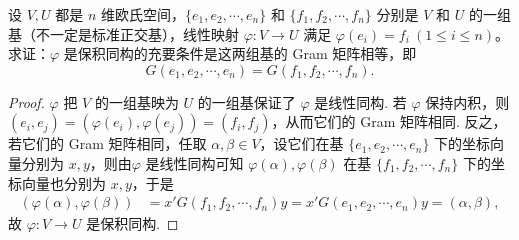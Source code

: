 \documentclass[../../main.tex]{subfiles}%
\begin{document}
\begin{proposition}\label{proposition:例9.35}
设 \(V,U\) 都是 \(n\) 维欧氏空间，\(\{e_1,e_2,\cdots,e_n\}\) 和 \(\{f_1,f_2,\cdots,f_n\}\) 分别是 \(V\) 和 \(U\) 的一组基（不一定是标准正交基），线性映射 \(\varphi:V\rightarrow U\) 满足 \(\varphi(e_i)=f_i\ (1\leqslant  i\leqslant  n)\)。求证：\(\varphi\) 是保积同构的充要条件是这两组基的 Gram 矩阵相等，即
\[
G(e_1,e_2,\cdots,e_n)=G(f_1,f_2,\cdots,f_n).
\]
\end{proposition}
\begin{proof}

\(\varphi\) 把 \(V\) 的一组基映为 \(U\) 的一组基保证了 \(\varphi\) 是线性同构. 若 \(\varphi\) 保持内积，则 \((e_i,e_j)=(\varphi(e_i),\varphi(e_j))=(f_i,f_j)\)，从而它们的 Gram 矩阵相同. 反之，若它们的 Gram 矩阵相同，任取 \(\alpha,\beta\in V\)，设它们在基 \(\{e_1,e_2,\cdots,e_n\}\) 下的坐标向量分别为 \(x,y\)，则由\(\varphi\) 是线性同构可知 \(\varphi(\alpha),\varphi(\beta)\) 在基 \(\{f_1,f_2,\cdots,f_n\}\) 下的坐标向量也分别为 \(x,y\)，于是
\begin{align*}
(\varphi(\alpha),\varphi(\beta))&=x'G(f_1,f_2,\cdots,f_n)y=x'G(e_1,e_2,\cdots,e_n)y=(\alpha,\beta),
\end{align*}
故 \(\varphi:V\rightarrow U\) 是保积同构. 

\end{proof}
\end{document}
